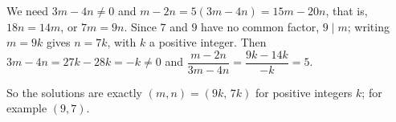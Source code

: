 We need $3m-4n\ne0$ and $m-2n=5(3m-4n)=15m-20n$, that is, $18n=14m$, or $7m=9n$. Since $7$ and $9$ have no common factor, $9\mid m$; writing $m=9k$ gives $n=7k$, with $k$ a positive integer. Then $3m-4n=27k-28k=-k\ne0$ and $\dfrac{m-2n}{3m-4n}=\dfrac{9k-14k}{-k}=5$.

So the solutions are exactly $\boxed{(m,n)=(9k,\,7k)}$ for positive integers $k$; for example $(9,7)$.
